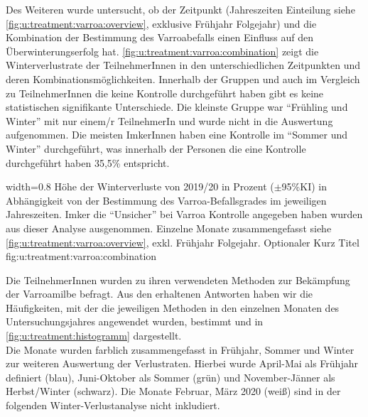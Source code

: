 Des Weiteren wurde untersucht, ob der Zeitpunkt (Jahreszeiten Einteilung siehe \cref{fig:u:treatment:varroa:overview}, exklusive Frühjahr Folgejahr) und die Kombination der Bestimmung des Varroabefalls einen Einfluss auf den Überwinterungserfolg hat. \cref{fig:u:treatment:varroa:combination} zeigt die Winterverlustrate der TeilnehmerInnen in den unterschiedlichen Zeitpunkten und deren Kombinationsmöglichkeiten. Innerhalb der Gruppen und auch im Vergleich zu TeilnehmerInnen die keine Kontrolle durchgeführt haben gibt es keine statistischen signifikante Unterschiede. Die kleinste Gruppe war \enquote{Frühling und Winter} mit nur einem/r TeilnehmerIn und wurde nicht in die Auswertung aufgenommen. Die meisten ImkerInnen haben eine Kontrolle im \enquote{Sommer und Winter} durchgeführt, was innerhalb der Personen die eine Kontrolle durchgeführt haben 35,5\% entspricht.

{width=0.8\textwidth} %
{Höhe der Winterverluste von 2019/20 in Prozent ($\pm$95\%KI) in Abhängigkeit von der Bestimmung des Varroa-Befallsgrades im jeweiligen Jahreszeiten. Imker die \enquote{Unsicher} bei Varroa Kontrolle angegeben haben wurden aus dieser Analyse ausgenommen. Einzelne Monate zusammengefasst siehe \cref{fig:u:treatment:varroa:overview}, exkl. Frühjahr Folgejahr.} %
{Optionaler Kurz Titel} %
{fig:u:treatment:varroa:combination} %


Die TeilnehmerInnen wurden zu ihren verwendeten Methoden zur Bekämpfung der Varroamilbe befragt. Aus den erhaltenen Antworten haben wir die Häufigkeiten, mit der die jeweiligen Methoden in den einzelnen Monaten des Untersuchungsjahres angewendet wurden, bestimmt und in \cref{fig:u:treatment:histogramm} dargestellt.  \\
Die Monate wurden farblich zusammengefasst in Frühjahr, Sommer und Winter zur weiteren Auswertung der Verlustraten. Hierbei wurde April-Mai als Frühjahr definiert (blau), Juni-Oktober als Sommer (grün) und November-Jänner als Herbst/Winter (schwarz). Die Monate Februar, März 2020 (weiß) sind in der folgenden Winter-Verlustanalyse nicht inkludiert.

